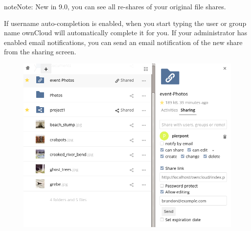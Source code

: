 \documentclass[letterpaper,10pt,english]{sphinxmanual}
\begin{document}
\begin{notice}{note}{Note:}
New in 9.0, you can see all re-shares of your original file shares.

If username auto-completion
is enabled, when you start typing the user or group name ownCloud will
automatically complete it for you. If your administrator has enabled email
notifications, you can send an email notification of the new share from the
sharing screen.
\end{notice}
\begin{figure}[htbp]
\centering

\includegraphics{files_page-2.png}
\end{figure}
\end{document}
